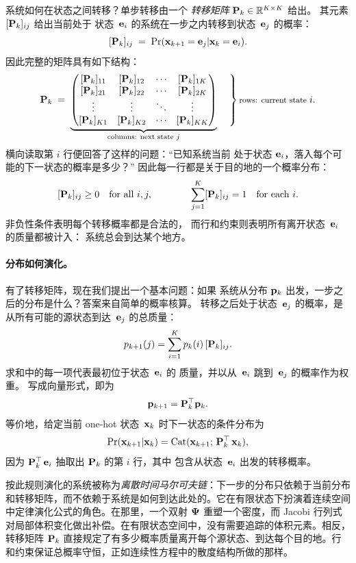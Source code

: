 系统如何在状态之间转移？单步转移由一个
\emph{转移矩阵} ${\mathbf{P}}_k \in \mathbb{R}^{K \times K}$ 给出。
其元素 $[{\mathbf{P}}_k]_{ij}$ 给出当前处于
状态~${\mathbf{e}}_i$ 的系统在一步之内转移到状态~${\mathbf{e}}_j$ 的概率：
\[
[{\mathbf{P}}_k]_{ij} \;=\; \Pr({\mathbf{x}}_{k+1} = {\mathbf{e}}_j | {\mathbf{x}}_k = {\mathbf{e}}_i).
\]
因此完整的矩阵具有如下结构：
\[
\rmP_k \;=\;
\underbrace{
\begin{pmatrix}
[\rmP_k]_{11} & [\rmP_k]_{12} & \cdots & [\rmP_k]_{1K} \\
[\rmP_k]_{21} & [\rmP_k]_{22} & \cdots & [\rmP_k]_{2K} \\
\vdots & \vdots & \ddots & \vdots \\
[\rmP_k]_{K1} & [\rmP_k]_{K2} & \cdots & [\rmP_k]_{KK}
\end{pmatrix}
}_{\substack{\text{columns: next state } j}}
\quad
\left.
\vphantom{
\begin{pmatrix}
a \\ a \\ \vdots \\ a
\end{pmatrix}
}
\right\}
\text{\footnotesize rows: current state } i.
\]
横向读取第 $i$ 行便回答了这样的问题：``已知系统当前
处于状态 ${\mathbf{e}}_i$，落入每个可能的下一状态的概率是多少？'' 因此每一行都是关于目的地的一个概率分布：
\[
[{\mathbf{P}}_k]_{ij} \geq 0
\quad \text{for all } i,j,
\qquad\qquad
\sum_{j=1}^{K} [{\mathbf{P}}_k]_{ij} = 1
\quad \text{for each } i.
\]
非负性条件表明每个转移概率都是合法的，
而行和约束则表明所有离开状态~${\mathbf{e}}_i$ 的质量都被计入：
系统总会到达某个地方。

\paragraph{分布如何演化。}
有了转移矩阵，现在我们提出一个基本问题：如果
系统从分布 ${\mathbf{p}}_k$ 出发，一步之后的分布是什么？答案来自简单的概率核算。
转移之后处于状态~${\mathbf{e}}_j$ 的概率，是
从所有可能的源状态到达~${\mathbf{e}}_j$ 的总质量：
\begin{equation}
p_{k+1}(j) = \sum_{i=1}^K p_k(i)\,[{\mathbf{P}}_k]_{ij}.
\label{eq:discrete-transport-one-step}
\end{equation}
求和中的每一项代表最初位于状态~${\mathbf{e}}_i$ 的
质量，并以从~${\mathbf{e}}_i$ 跳到~${\mathbf{e}}_j$ 的概率作为权重。
写成向量形式，即为
\[
{\mathbf{p}}_{k+1} = {\mathbf{P}}_k^\top {\mathbf{p}}_k.
\]
等价地，给定当前 one-hot 状态~${\mathbf{x}}_k$ 时下一状态的条件分布为
\[
\Pr({\mathbf{x}}_{k+1} | {\mathbf{x}}_k)
= \mathrm{Cat}({\mathbf{x}}_{k+1};\,{\mathbf{P}}_k^\top\,{\mathbf{x}}_k),
\]
因为 ${\mathbf{P}}_k^\top\,{\mathbf{e}}_i$ 抽取出 ${\mathbf{P}}_k$ 的第 $i$ 行，其中
包含从状态~${\mathbf{e}}_i$ 出发的转移概率。

按此规则演化的系统被称为\emph{离散时间马尔可夫链}：下一步的分布只依赖于当前分布和转移矩阵，而不依赖于系统是如何到达此处的。它在有限状态下扮演着连续空间中定律演化公式的角色。在那里，一个双射 ${\bm{\Psi}}$ 重塑一个密度，而 Jacobi 行列式对局部体积变化做出补偿。在有限状态空间中，没有需要追踪的体积元素。相反，转移矩阵 ${\mathbf{P}}_k$ 直接规定了有多少概率质量离开每个源状态、到达每个目的地。行和约束保证总概率守恒，正如连续性方程中的散度结构所做的那样。

